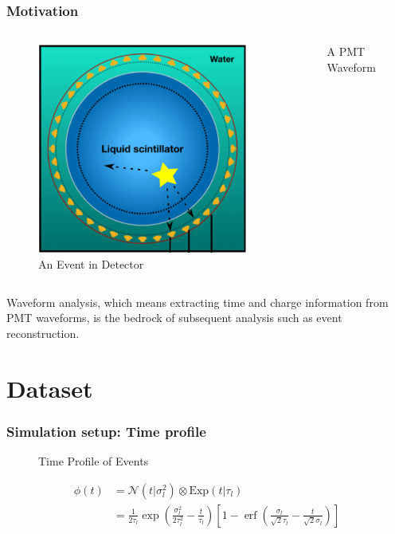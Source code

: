 \documentclass{beamer}
\DeclareMathOperator{\erf}{erf}
\begin{document}
\begin{CJK*}{UTF8}{gbsn}
\begin{frame}
\frametitle{Motivation}
\begin{columns}
\begin{figure}
    \centering
    \includegraphics[width=1.0\linewidth]{img/event.png}
    \caption{An Event in Detector}
\end{figure}
\begin{figure}
    \centering
    \resizebox{\textwidth}{!}{}
    \caption{A PMT Waveform}
\end{figure}
\end{columns}
\begin{block}{}
Waveform analysis, which means extracting time and charge information from PMT waveforms, is the bedrock of subsequent analysis such as event reconstruction. 
\end{block}
\end{frame}

\section{Dataset}

\begin{frame}
\frametitle{Simulation setup: Time profile}
\begin{figure}
    \centering
    \resizebox{0.6\textwidth}{!}{}
    \caption{Time Profile of Events}
\end{figure}
\begin{align*}
    \phi(t) &= \mathcal{N}(t|\sigma_l^2)\otimes \mathrm{Exp}(t|\tau_l) \\
    &= \frac{1}{2\tau_l} \exp\left(\frac{\sigma_l^2}{2\tau_l^2}-\frac{t}{\tau_l}\right) \left[1 - \erf\left( \frac{\sigma_l}{\sqrt{2}\tau_l} - \frac{t}{\sqrt{2}\sigma_l} \right)\right]
\end{align*}
\end{frame}


\end{CJK*}
\end{document}
